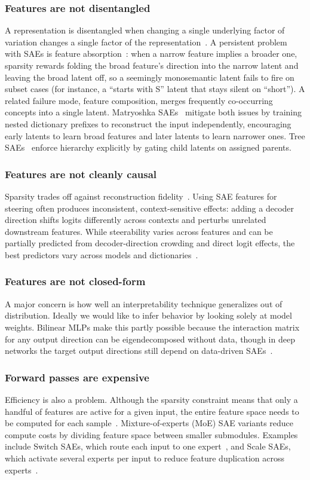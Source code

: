 \subsubsection{Features are not disentangled}
A representation is disentangled when changing a single underlying factor
of variation changes a single factor of the
representation~\cite{locatello2019}. A persistent problem with SAEs is
feature absorption~\cite{chanin2025}: when a narrow feature implies a
broader one, sparsity rewards folding the broad feature's direction into
the narrow latent and leaving the broad latent off, so a seemingly
monosemantic latent fails to fire on subset cases (for instance, a
``starts with S'' latent that stays silent on ``short''). A related
failure mode, feature composition, merges frequently co-occurring
concepts into a single latent. Matryoshka SAEs~\cite{bussmann2025}
mitigate both issues by training nested dictionary prefixes to
reconstruct the input independently, encouraging early latents to learn
broad features and later latents to learn narrower ones. Tree
SAEs~\cite{cao2026} enforce hierarchy explicitly by gating child latents
on assigned parents.

\subsubsection{Features are not cleanly causal}
Sparsity trades off against reconstruction fidelity~\cite{gao2024}.
Using SAE features for steering often produces inconsistent,
context-sensitive effects: adding a decoder direction shifts logits
differently across contexts and perturbs unrelated downstream features.
While steerability varies across features and can be partially predicted
from decoder-direction crowding and direct logit effects, the best
predictors vary across models and dictionaries~\cite{duan2026}.

\subsubsection{Features are not closed-form}
A major concern is how well an interpretability technique generalizes
out of distribution. Ideally we would like to infer behavior by looking
solely at model weights. Bilinear MLPs make this partly possible because
the interaction matrix for any output direction can be eigendecomposed
without data, though in deep networks the target output directions still
depend on data-driven SAEs~\cite{pearce2025}.

\subsubsection{Forward passes are expensive}
Efficiency is also a problem. Although the sparsity constraint means
that only a handful of features are active for a given input, the
entire feature space needs to be computed for each
sample~\cite{gao2024,mudide2025}. Mixture-of-experts (MoE) SAE variants
reduce compute costs by dividing feature space between smaller
submodules. Examples include Switch SAEs, which route each input to one
expert~\cite{mudide2025}, and Scale SAEs, which activate several experts
per input to reduce feature duplication across
experts~\cite{xu2025redundancydiversespecializedmultiexpert}.

